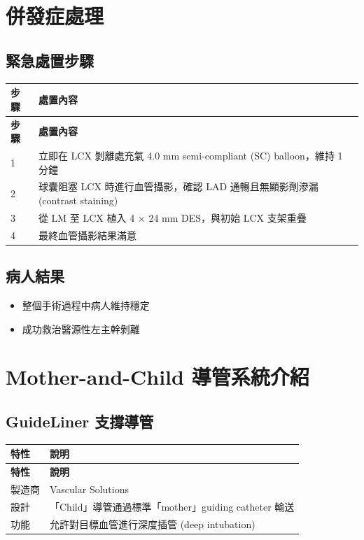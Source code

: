 \documentclass[12pt,a4paper]{article}
\begin{document}
\section{併發症處理}

\subsection{緊急處置步驟}

\begin{longtable}{p{1cm}p{13cm}}
\toprule
\textbf{步驟} & \textbf{處置內容} \\
\midrule
\endfirsthead
\toprule
\textbf{步驟} & \textbf{處置內容} \\
\midrule
\endhead
1 & 立即在 LCX 剝離處充氣 4.0 mm semi-compliant (SC) balloon，維持 1 分鐘 \\
\midrule
2 & 球囊阻塞 LCX 時進行血管攝影，確認 LAD 通暢且無顯影劑滲漏 (contrast staining) \\
\midrule
3 & 從 LM 至 LCX 植入 4 × 24 mm DES，與初始 LCX 支架重疊 \\
\midrule
4 & 最終血管攝影結果滿意 \\
\bottomrule
\end{longtable}

\subsection{病人結果}

\begin{itemize}
    \item 整個手術過程中病人維持穩定
    \item 成功救治醫源性左主幹剝離
\end{itemize}

\section{Mother-and-Child 導管系統介紹}

\subsection{GuideLiner 支撐導管}

\begin{longtable}{p{4cm}p{10cm}}
\toprule
\textbf{特性} & \textbf{說明} \\
\midrule
\endfirsthead
\toprule
\textbf{特性} & \textbf{說明} \\
\midrule
\endhead
製造商 & Vascular Solutions \\
\midrule
設計 & 「Child」導管通過標準「mother」guiding catheter 輸送 \\
\midrule
功能 & 允許對目標血管進行深度插管 (deep intubation) \\
\bottomrule
\end{longtable}
\end{document}
